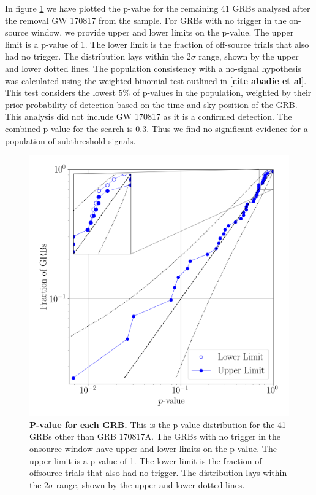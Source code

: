 \documentclass[11pt]{cuthesis}
\begin{document}
In figure \ref{fig:pvalue} we have plotted the p-value for the remaining 41 GRBs analysed after the removal GW 170817 from the sample. For GRBs with no trigger in the on-source window, we provide upper and lower limits on the p-value. The upper limit is a p-value of 1. The lower limit is the fraction of off-source trials that also had no trigger. The distribution lays within the $2\sigma$ range, shown by the upper and lower dotted lines. The population consistency with a no-signal hypothesis was calculated using the weighted binomial test outlined in [\textbf{cite abadie et al}]. This test considers the lowest $5\%$ of p-values in the population, weighted by their prior probability of detection based on the time and sky position of the GRB. This analysis did not include GW 170817 as it is a confirmed detection. The combined p-value for the search is 0.3. Thus we find no significant evidence for a population of subthreshold signals.  

\begin{figure}
\begin{center}
\includegraphics[width=0.8\linewidth]{pygrb_pvalue.png}
\end{center}
\caption{\textbf{P-value for each GRB.} This is the p-value distribution for the 41 GRBs other than GRB 170817A. The GRBs with no trigger in the onsource window have upper and lower limits on the p-value. The upper limit is a p-value of 1. The lower limit is the fraction of offsource trials that also had no trigger. The distribution lays within the $2\sigma$ range, shown by the upper and lower dotted lines.  }
\label{fig:pvalue}
\end{figure}
\end{document}
